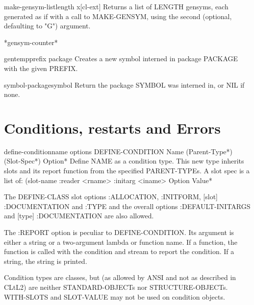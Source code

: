 \documentclass[10pt,english]{book}
\begin{document}
\begin{function}{make-gensym-list}{length \op x}[cl-ext]
  Returns a list of LENGTH gensyms, each generated as if with a call to MAKE-GENSYM,
using the second (optional, defaulting to "G") argument.
\end{function}

\begin{variable}{*gensym-counter*}{}
  
\end{variable}

\begin{function}{gentemp}{\op prefix package}
  Creates a new symbol interned in package PACKAGE with the given PREFIX.
\end{function}

\begin{function}{symbol-package}{symbol}
  Return the package SYMBOL was interned in, or NIL if none.
\end{function}



\chapter{Conditions, restarts and Errors}
\label{cha:cond-rest-errors}

\begin{macro}{define-condition}{name \rest \rest \body options}
  DEFINE-CONDITION Name (Parent-Type*) (Slot-Spec*) Option*
   Define NAME as a condition type. This new type inherits slots and its
   report function from the specified PARENT-TYPEs. A slot spec is a list of:
     (slot-name :reader <rname> :initarg <iname> {Option Value}*

   The DEFINE-CLASS slot options :ALLOCATION, :INITFORM, [slot] :DOCUMENTATION
   and :TYPE and the overall options :DEFAULT-INITARGS and
   [type] :DOCUMENTATION are also allowed.

   The :REPORT option is peculiar to DEFINE-CONDITION. Its argument is either
   a string or a two-argument lambda or function name. If a function, the
   function is called with the condition and stream to report the condition.
   If a string, the string is printed.

   Condition types are classes, but (as allowed by ANSI and not as described in
   CLtL2) are neither STANDARD-OBJECTs nor STRUCTURE-OBJECTs. WITH-SLOTS and
   SLOT-VALUE may not be used on condition objects.
\end{macro}
\end{document}
